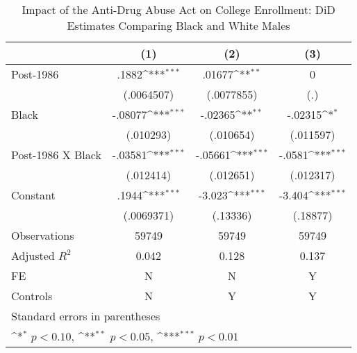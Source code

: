 \begin{table}[htbp]\centering
\def\sym#1{\ifmmode^{#1}\else\(^{#1}\)\fi}
\caption{Impact of the Anti-Drug Abuse Act on College Enrollment: DiD Estimates Comparing Black and White Males}
\begin{tabular}{l*{3}{c}}
\hline\hline
                    &\multicolumn{1}{c}{(1)}         &\multicolumn{1}{c}{(2)}         &\multicolumn{1}{c}{(3)}         \\
\hline
Post-1986           &       .1882\sym{***}&      .01677\sym{**} &           0         \\
                    &  (.0064507)         &  (.0077855)         &         (.)         \\
[1em]
Black               &     -.08077\sym{***}&     -.02365\sym{**} &     -.02315\sym{*}  \\
                    &   (.010293)         &   (.010654)         &   (.011597)         \\
[1em]
Post-1986 X Black   &     -.03581\sym{***}&     -.05661\sym{***}&      -.0581\sym{***}\\
                    &   (.012414)         &   (.012651)         &   (.012317)         \\
[1em]
Constant            &       .1944\sym{***}&      -3.023\sym{***}&      -3.404\sym{***}\\
                    &  (.0069371)         &    (.13336)         &    (.18877)         \\
\hline
Observations        &       59749         &       59749         &       59749         \\
Adjusted \(R^{2}\)  &       0.042         &       0.128         &       0.137         \\
FE                  &           N         &           N         &           Y         \\
Controls            &           N         &           Y         &           Y         \\
\hline\hline
\multicolumn{4}{l}{\footnotesize Standard errors in parentheses}\\
\multicolumn{4}{l}{\footnotesize \sym{*} \(p<0.10\), \sym{**} \(p<0.05\), \sym{***} \(p<0.01\)}\\
\end{tabular}
\end{table}

